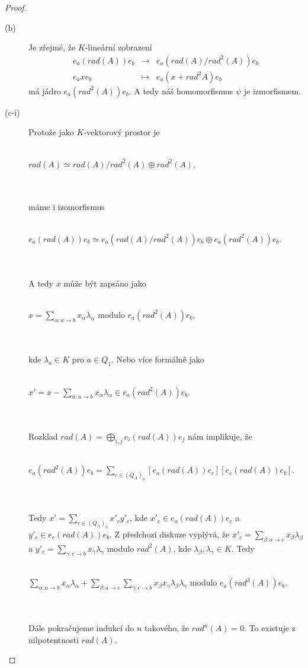 \begin{proof}
\begin{description}
        \item[(b)] Je zřejmé, že $K$-lineární zobrazení 
          \begin{eqnarray}
            e_a (rad(A)) e_b &\to&   e_a (rad(A)/rad^2(A)) e_b \nonumber \\
            e_axe_b &\mapsto&   e_a(x+rad^2A)e_b \nonumber
          \end{eqnarray}
          má jádro $e_a (rad^2(A)) e_b$. A tedy náš homomorfismus $\psi$ je 
          izmorfismem.
        
        \item[(c-i)] Protože jako $K$-vektorový prostor je \\\\
          \centerline{$rad(A)\simeq rad(A)/rad^2(A)\oplus rad^2(A)$,} \\\\
          máme i izomorfismus  \\\\
          \centerline{$e_a(rad(A))e_b\simeq e_a(rad(A)/rad^2(A))e_b\oplus e_a(rad^2(A))e_b$.} \\\\
          A tedy $x$ může být zapsáno jako\\\\
          \centerline{$
            x = \sum_{\alpha:a\to b}x_\alpha \lambda_\alpha $ modulo $  e_a(rad^2(A))e_b
          $,}\\\\  
          kde $\lambda_a\in K$ pro $a\in Q_1$. Nebo více formálně jako \\\\
          \centerline{$x'=x-\sum_{\alpha:a\to b}x_\alpha \lambda_\alpha\in e_a(rad^2(A))e_b$.} \\\\      
          Rozklad $rad(A)=\bigoplus_{i,j}e_i(rad(A))e_j$ nám implikuje, že \\\\
          \centerline{$e_a(rad^2(A))e_b=\sum_{c\in(Q_A)_0}[e_a(rad(A))e_c][e_c(rad(A))e_b]$.} 
          \\\\
          Tedy $x'=\sum_{c\in(Q_A)_0}x'_cy'_c$, kde $x'_c\in e_a(rad(A))e_c$ a $y'_c\in 
          e_c(rad(A))e_b$. Z předchozí diskuze vyplývá, že 
          $x'_c=\sum_{\beta:a\to c}x_\beta\lambda_\beta$ a
          $y'_c=\sum_{\gamma:c\to b}x_\gamma\lambda_\gamma$
          modulo $rad^2(A)$, kde $\lambda_\beta,\lambda_\gamma\in K$. Tedy \\\\
          \centerline{$
            \sum_{\alpha:a\to b}x_\alpha \lambda_\alpha + 
            \sum_{\beta:a\to c}
            \sum_{\gamma:c\to b}
            x_\beta x_\gamma \lambda_\beta \lambda_\gamma
            $ modulo $  e_a(rad^3(A))e_b 
          $.}\\\\
          Dále pokračujeme indukcí do $n$ takového, že  $rad^n(A)=0$. To 
          existuje z nilpotentnosti $rad(A)$.
                    

\end{description}
\end{proof}
